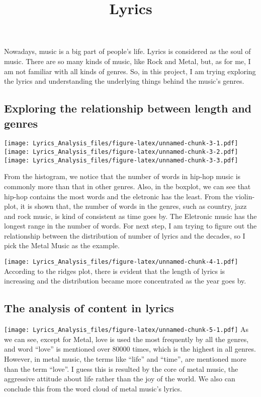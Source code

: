 \documentclass[]{article}
\title{Lyrics}
\author{}
\date{}
\begin{document}
\maketitle

Nowadays, music is a big part of people's life. Lyrics is considered as
the soul of music. There are so many kinds of music, like Rock and
Metal, but, as for me, I am not familiar with all kinds of genres. So,
in this project, I am trying exploring the lyrics and understanding the
underlying things behind the music's genres.

\hypertarget{exploring-the-relationship-between-length-and-genres}{%
\subsection{Exploring the relationship between length and
genres}\label{exploring-the-relationship-between-length-and-genres}}

\texttt{[image: Lyrics\_Analysis\_files/figure-latex/unnamed-chunk-3-1.pdf]}
\texttt{[image: Lyrics\_Analysis\_files/figure-latex/unnamed-chunk-3-2.pdf]}
\texttt{[image: Lyrics\_Analysis\_files/figure-latex/unnamed-chunk-3-3.pdf]}

From the histogram, we notice that the number of words in hip-hop music
is commonly more than that in other genres. Also, in the boxplot, we can
see that hip-hop contains the most words and the eletronic has the
least. From the violin-plot, it is shown that, the number of words in
the genres, such as country, jazz and rock music, is kind of consistent
as time goes by. The Eletronic music has the longest range in the number
of words. For next step, I am trying to figure out the relationship
between the distribution of number of lyrics and the decades, so I pick
the Metal Music as the example.

\texttt{[image: Lyrics\_Analysis\_files/figure-latex/unnamed-chunk-4-1.pdf]}
According to the ridges plot, there is evident that the length of lyrics
is increasing and the distribution became more concentrated as the year
goes by.

\hypertarget{the-analysis-of-content-in-lyrics}{%
\subsection{The analysis of content in
lyrics}\label{the-analysis-of-content-in-lyrics}}

\texttt{[image: Lyrics\_Analysis\_files/figure-latex/unnamed-chunk-5-1.pdf]}
As we can see, except for Metal, love is used the most frequently by all
the genres, and word ``love'' is mentioned over 80000 times, which is
the highest in all genres. However, in metal music, the terms like
``life'' and ``time'', are mentioned more than the term ``love''. I
guess this is resulted by the core of metal music, the aggressive
attitude about life rather than the joy of the world. We also can
conclude this from the word cloud of metal music's lyrics.
\end{document}
